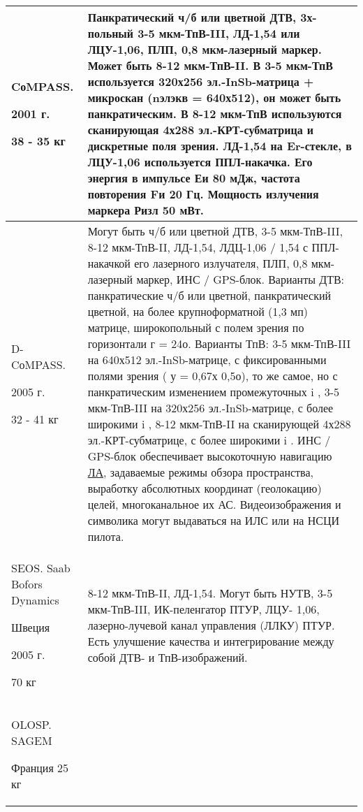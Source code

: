 \begin{landscape}
\begin{longtable}{| p{6cm} | p{18cm} |}
	\\ \hline
		CоMPASS.		
		
		2001 г. 	
		
		38 - 35 кг 
& 
\small Панкратический ч/б или цветной ДТВ, 3х-польный 3-5 мкм-ТпВ-III, ЛД-1,54 или ЛЦУ-1,06, ПЛП, 0,8 мкм-лазерный маркер. Может быть 8-12 мкм-ТпВ-II. В 3-5 мкм-ТпВ используется 320х256 эл.-InSb-матрица + микроскан (nэлэкв = 640х512), он может быть панкратическим. В 8-12 мкм-ТпВ используются сканирующая 4х288 эл.-КРТ-субматрица и дискретные поля зрения. ЛД-1,54 на Er-стекле, в ЛЦУ-1,06 используется ППЛ-накачка. Его энергия в импульсе Еи 80 мДж, частота повторения Fи 20 Гц. Мощность излучения маркера Ризл 50 мВт. 
 
\\ \hline
		D-CоMPASS.
				
		2005 г. 
			
		32 - 41 кг 
& 
\small Могут быть ч/б или цветной ДТВ, 3-5 мкм-ТпВ-III, 8-12 мкм-ТпВ-II, ЛД-1,54, ЛДЦ-1,06 / 1,54 с ППЛ- накачкой его лазерного излучателя, ПЛП, 0,8 мкм-лазерный маркер, ИНС / GPS-блок.  Варианты ДТВ: панкратические ч/б или цветной, панкратический цветной, на более крупноформатной (1,3 мп) матрице, широкопольный с полем зрения по горизонтали г = 24о. Варианты ТпВ: 3-5 мкм-ТпВ-III на 640х512 эл.-InSb-матрице, с фиксированными полями зрения ( у = 0,67х 0,5о), то же самое, но с панкратическим изменением промежуточных i , 3-5 мкм-ТпВ-III на 320х256 эл.-InSb-матрице, с более широкими i , 8-12 мкм-ТпВ-II на сканирующей 4х288 эл.-КРТ-субматрице, с более широкими i . ИНС / GPS-блок обеспечивает высокоточную навигацию  \hyperref[acroLA]{ЛА}, задаваемые режимы обзора пространства, выработку абсолютных координат (геолокацию) целей, многоканальное их АС. Видеоизображения и символика могут выдаваться на ИЛС или на НСЦИ пилота. 
 
\\ \hline
	SEOS. Saab Bofors Dynamics \cite[]{doi:10.1117/12.450557}
	
	Швеция	
	
	2005 г. 	
	
	70 кг	 
& 
8-12 мкм-ТпВ-II, ЛД-1,54. Могут быть НУТВ, 3-5 мкм-ТпВ-III, ИК-пеленгатор ПТУР, ЛЦУ-
1,06, лазерно-лучевой канал управления (ЛЛКУ) ПТУР.
Есть улучшение качества и интегрирование между собой ДТВ- и ТпВ-изображений.
 
\\ \hline
		OLOSP. SAGEM
		\cite[]{sagem-olosp}
		
		Франция		25 кг
		 

\end{longtable}
\end{landscape}
